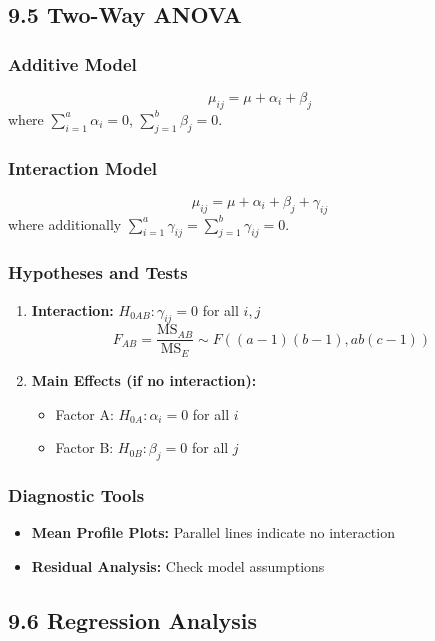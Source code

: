 \subsection{9.5 Two-Way ANOVA}

\subsubsection{Additive Model}
\[
\mu_{ij} = \mu + \alpha_i + \beta_j
\]
where $\sum_{i=1}^a \alpha_i = 0$, $\sum_{j=1}^b \beta_j = 0$.

\subsubsection{Interaction Model}
\[
\mu_{ij} = \mu + \alpha_i + \beta_j + \gamma_{ij}
\]
where additionally $\sum_{i=1}^a \gamma_{ij} = \sum_{j=1}^b \gamma_{ij} = 0$.

\subsubsection{Hypotheses and Tests}

\begin{enumerate}
	\item \textbf{Interaction:} $H_{0AB}: \gamma_{ij} = 0$ for all $i,j$
\[
F_{AB} = \frac{\text{MS}_{AB}}{\text{MS}_E} \sim F((a-1)(b-1), ab(c-1))
\]
	\item \textbf{Main Effects (if no interaction):}
	\begin{itemize}
		\item Factor A: $H_{0A}: \alpha_i = 0$ for all $i$
		\item Factor B: $H_{0B}: \beta_j = 0$ for all $j$
	\end{itemize}
\end{enumerate}

\subsubsection{Diagnostic Tools}

\begin{itemize}
	\item \textbf{Mean Profile Plots:} Parallel lines indicate no interaction
	\item \textbf{Residual Analysis:} Check model assumptions
\end{itemize}

\subsection{9.6 Regression Analysis}


